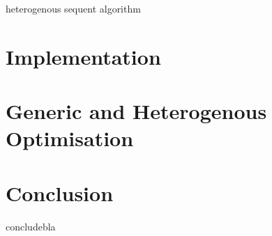 \documentclass{entcs} \usepackage{entcsmacro}
\begin{document}
heterogenous sequent algorithm

\section{Implementation}

\section{Generic and Heterogenous Optimisation}

\section{Conclusion}  

concludebla



\end{document}

